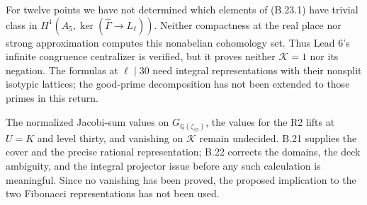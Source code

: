 For twelve points we have not determined which elements
of (B.23.1) have trivial class in
\(H^1(A_5,\ker(\widehat\Gamma\to L_\ell))\).
Neither compactness at the real place nor strong
approximation computes this nonabelian cohomology set.
Thus Lead 6's infinite congruence centralizer is verified,
but it proves neither \(\mathcal K=1\) nor its negation.
The formulas at \(\ell\mid30\) need integral
representations with their nonsplit isotypic lattices;
the good-prime decomposition has not been extended to
those primes in this return.

The normalized Jacobi-sum values on
\(G_{\mathbb Q(\zeta_{15})}\), the
values for the R2 lifts at \(U=K\) and level thirty,
and vanishing on \(\mathcal K\) remain undecided.
B.21 supplies the cover and the precise rational
representation; B.22 corrects the domains, the deck
ambiguity, and the integral projector issue before
any such calculation is meaningful. Since no vanishing
has been proved, the proposed implication to the two
Fibonacci representations has not been used.
